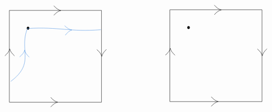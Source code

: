 \documentclass{article}
\begin{document}
\[\begin{tikzpicture}[x=0.75pt,y=0.75pt,yscale=-1,xscale=1]
\draw   (100,65) -- (249.27,65) -- (249.27,214.27) -- (100,214.27) -- cycle ;
\draw   (172,57.4) .. controls (175.76,61.73) and (179.51,64.33) .. (183.27,65.2) .. controls (179.51,66.07) and (175.76,68.67) .. (172,73) ;
\draw   (167,206.4) .. controls (170.76,210.73) and (174.51,213.33) .. (178.27,214.2) .. controls (174.51,215.07) and (170.76,217.67) .. (167,222) ;
\draw   (257.33,128.43) .. controls (253.07,132.26) and (250.54,136.06) .. (249.73,139.83) .. controls (248.8,136.09) and (246.13,132.39) .. (241.73,128.71) ;
\draw   (92.8,138.79) .. controls (97.15,135.05) and (99.77,131.32) .. (100.67,127.57) .. controls (101.51,131.33) and (104.09,135.09) .. (108.4,138.88) ;
\draw  [color={rgb, 255:red, 0; green, 0; blue, 0 }  ][line width=3] [line join = round][line cap = round] (130.27,93.4) .. controls (130.27,93.73) and (130.27,94.07) .. (130.27,94.4) ;
\draw   (360,64) -- (509.27,64) -- (509.27,213.27) -- (360,213.27) -- cycle ;
\draw   (432,56.4) .. controls (435.76,60.73) and (439.51,63.33) .. (443.27,64.2) .. controls (439.51,65.07) and (435.76,67.67) .. (432,72) ;
\draw   (427,205.4) .. controls (430.76,209.73) and (434.51,212.33) .. (438.27,213.2) .. controls (434.51,214.07) and (430.76,216.67) .. (427,221) ;
\draw   (517.33,127.43) .. controls (513.07,131.26) and (510.54,135.06) .. (509.73,138.83) .. controls (508.8,135.09) and (506.13,131.39) .. (501.73,127.71) ;
\draw   (352.8,137.79) .. controls (357.15,134.05) and (359.77,130.32) .. (360.67,126.57) .. controls (361.51,130.33) and (364.09,134.09) .. (368.4,137.88) ;
\draw  [color={rgb, 255:red, 0; green, 0; blue, 0 }  ][line width=3] [line join = round][line cap = round] (390.27,92.4) .. controls (390.27,92.73) and (390.27,93.07) .. (390.27,93.4) ;
\draw [color={rgb, 255:red, 74; green, 144; blue, 226 }  ,draw opacity=1 ]   (102.27,180.4) .. controls (142.27,150.4) and (115.27,130.4) .. (129.27,94.4) ;
\draw [color={rgb, 255:red, 74; green, 144; blue, 226 }  ,draw opacity=1 ]   (129.27,94.4) .. controls (183.27,91.4) and (196.27,100.4) .. (248.27,96.4) ;
\draw  [color={rgb, 255:red, 74; green, 144; blue, 226 }  ,draw opacity=1 ] (116.67,140.6) .. controls (121.11,136.97) and (123.82,133.3) .. (124.8,129.57) .. controls (125.56,133.35) and (128.05,137.17) .. (132.26,141.06) ;
\draw  [color={rgb, 255:red, 74; green, 144; blue, 226 }  ,draw opacity=1 ] (189.47,89.81) .. controls (193.52,93.87) and (197.44,96.2) .. (201.25,96.81) .. controls (197.57,97.94) and (194.01,100.79) .. (190.56,105.37) ;

\end{tikzpicture}\]
\end{document}
